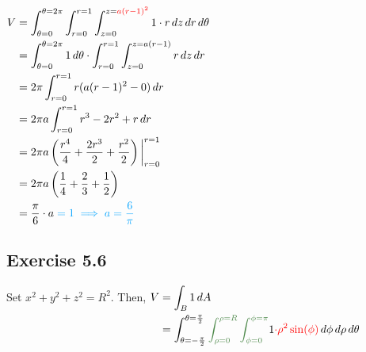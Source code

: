 $\begin{aligned}[t]
    V & = \int_{\theta=0}^{\theta=2\pi} \int_{r=0}^{r=1} \int_{z=0}^{{z=\color{red}a(r-1)^2}} 1 \cdot r \,dz \,dr \,d\theta \\
      & = \int_{\theta=0}^{\theta=2\pi} 1 \,d\theta \cdot \int_{r=0}^{r=1}\int_{z=0}^{z=a(r-1)} r \,dz \,dr                 \\
      & = 2\pi \int_{r=0}^{r=1} r(a(r-1)^2 - 0) \,dr                                                                        \\
      & = 2\pi a \int_{r=0}^{r=1} r^3 - 2r^2 + r \,dr                                                                       \\
      & = 2\pi a \left( \frac{r^4}{4} + \frac{2r^3}{2} + \frac{r^2}{2} \right) \bigg|_{r=0}^{r=1}                           \\
      & = 2\pi a \left( \frac{1}{4} + \frac{2}{3} + \frac{1}{2} \right)                                                     \\
      & = \frac{\pi}{6} \cdot a \color{LightBlue} = 1 \implies a = \frac{6}{\pi}
\end{aligned}$

\subsection*{Exercise 5.6}

Set $x^2 + y^2 + z^2 = R^2$. Then, $\begin{aligned}[t]
    V &= \int_B 1 \,dA \\
    &= \int_{\theta=-\frac{\pi}{2}}^{\theta=\frac{\pi}{2}} {\color{DarkGreen} \int_{\rho=0}^{\rho=R} \int_{\phi=0}^{\phi=\pi}} 1 {\color{red} \cdot \rho^2 \sin(\phi) } \,d\phi \,d\rho \,d\theta
\end{aligned}$